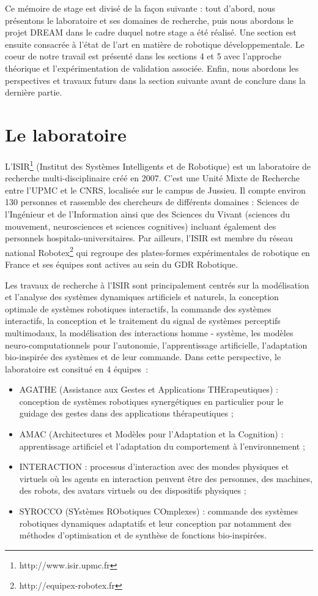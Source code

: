 \documentclass{llncs}
\begin{document}
Ce mémoire de stage est divisé de la façon suivante : tout d'abord, nous présentons le laboratoire et ses domaines de recherche, puis nous abordons le projet DREAM dans le cadre duquel notre stage a été réalisé. Une section est ensuite consacrée à l'état de l'art en matière de robotique développementale. Le coeur de notre travail est présenté dans les sections 4 et 5 avec l'approche théorique et l'expérimentation de validation associée. Enfin, nous abordons les perspectives et travaux futurs dans la section suivante avant de conclure dans la dernière partie.


\section{Le laboratoire}

\lettrine{L}{'ISIR\footnote{http://www.isir.upmc.fr}} (Institut des Systèmes Intelligents et de Robotique) est un laboratoire de recherche multi-disciplinaire créé en 2007. C'est une Unité Mixte de Recherche entre l'UPMC et le CNRS, localisée sur le campus de Jussieu. Il compte environ 130 personnes et rassemble des chercheurs de différents domaines : Sciences de l’Ingénieur et de l’Information ainsi que des Sciences du Vivant (sciences du mouvement, neurosciences et sciences cognitives)  incluant également des personnels hospitalo-universitaires. Par ailleurs, l'ISIR est membre du réseau national Robotex\footnote{http://equipex-robotex.fr} qui regroupe des plates-formes expérimentales de robotique en France et ses équipes sont actives au sein du GDR Robotique.

Les travaux de recherche à l'ISIR sont principalement centrés sur la modélisation et l'analyse des systèmes dynamiques artificiels et naturels, la conception optimale de systèmes robotiques interactifs, la commande des systèmes interactifs, la conception et le traitement du signal de systèmes perceptifs multimodaux, la modélisation des interactions homme - système, les modèles neuro-computationnels pour l’autonomie, l'apprentissage artificielle, l'adaptation bio-inspirée des systèmes et de leur commande. Dans cette perspective, le laboratoire est consitué en 4 équipes~:
\begin{itemize}
\item AGATHE (Assistance aux Gestes et Applications THErapeutiques) : conception de systèmes robotiques synergétiques en particulier pour le guidage des gestes dans des applications thérapeutiques ;
\item AMAC (Architectures et Modèles pour l'Adaptation et la Cognition) : apprentissage artificiel et l’adaptation du comportement à l’environnement ;
\item INTERACTION : processus d’interaction avec des mondes physiques et virtuels où les agents en interaction peuvent être des personnes, des machines, des robots, des avatars virtuels ou des dispositifs physiques ;
\item SYROCCO (SYstèmes RObotiques COmplexes) : commande des systèmes robotiques dynamiques adaptatifs et leur conception par notamment des méthodes d’optimisation et de synthèse de fonctions bio-inspirées.
\end{itemize}
\end{document}
